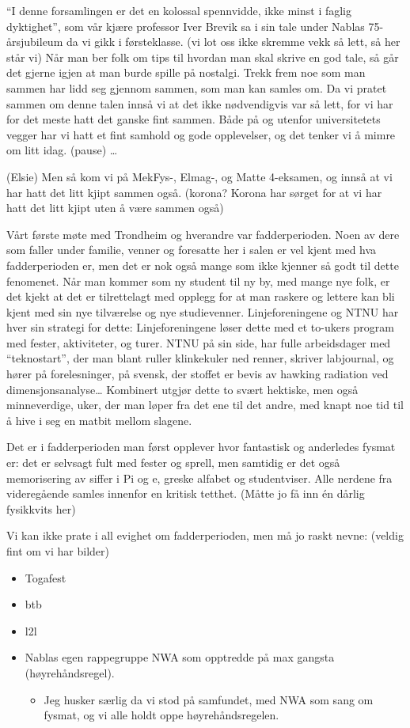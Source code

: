 \documentclass[16pt, a4paper]{article}
\begin{document}
``I denne forsamlingen er det en kolossal spennvidde, ikke minst i faglig dyktighet'',
som vår kjære professor Iver Brevik sa i sin tale under Nablas 75-årsjubileum da vi gikk i førsteklasse.
(vi lot oss ikke skremme vekk så lett, så her står vi)
Når man ber folk om tips til hvordan man skal skrive en god tale, så går det gjerne igjen at man burde spille på nostalgi.
Trekk frem noe som man sammen har lidd seg gjennom sammen, som man kan samles om.
Da vi pratet sammen om denne talen innså vi at det ikke nødvendigvis var så lett, for vi har for det meste hatt det ganske fint sammen.
Både på og utenfor universitetets vegger har vi hatt et fint samhold og gode opplevelser, og det tenker vi å mimre om litt idag.
(pause)
\ldots{}

(Elsie)
Men så kom vi på MekFys-, Elmag-, og Matte 4-eksamen, og innså at vi har hatt det litt kjipt sammen også.
(korona? Korona har sørget for at vi har hatt det litt kjipt uten å være sammen også)

Vårt første møte med Trondheim og hverandre var fadderperioden.
Noen av dere som faller under familie, venner og foresatte her i salen er vel kjent med hva fadderperioden er, men det er nok også mange som ikke kjenner så godt til dette fenomenet.
Når man kommer som ny student til ny by, med mange nye folk, er det kjekt at det er tilrettelagt med opplegg for at man raskere og lettere kan bli kjent med sin nye tilværelse og nye studievenner.
Linjeforeningene og NTNU har hver sin strategi for dette:
Linjeforeningene løser dette med et to-ukers program med fester, aktiviteter, og turer.
NTNU på sin side, har fulle arbeidsdager med ``teknostart'', der man blant ruller klinkekuler ned renner, skriver labjournal, og hører på forelesninger, på svensk, der stoffet er bevis av hawking radiation ved dimensjonsanalyse\ldots{}
Kombinert utgjør dette to svært hektiske, men også minneverdige, uker, der man løper fra det ene til det andre, med knapt noe tid til å hive i seg en matbit mellom slagene.

Det er i fadderperioden man først opplever hvor fantastisk og anderledes fysmat er:
det er selvsagt fult med fester og sprell, men samtidig er det også memorisering av siffer i Pi og e, greske alfabet og studentviser.
Alle nerdene fra videregående samles innenfor en kritisk tetthet.
(Måtte jo få inn én dårlig fysikkvits her)

Vi kan ikke prate i all evighet om fadderperioden, men må jo raskt nevne:
(veldig fint om vi har bilder)
\begin{itemize}
\item Togafest
\item btb
\item l2l
\item Nablas egen rappegruppe NWA som opptredde på max gangsta (høyrehåndsregel).
\begin{itemize}
\item Jeg husker særlig da vi stod på samfundet, med NWA som sang om fysmat, og vi alle holdt oppe høyrehåndsregelen.
\end{itemize}
\end{itemize}
\end{document}
